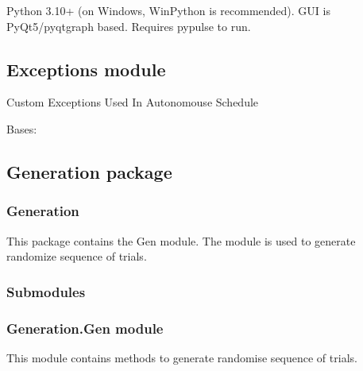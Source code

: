 \documentclass[letterpaper,10pt,english]{sphinxmanual}
\begin{document}
\sphinxAtStartPar
Python 3.10+ (on Windows, WinPython is recommended). GUI is PyQt5/pyqtgraph based. Requires pypulse to run.

\sphinxstepscope


\subsection{Exceptions module}
\label{\detokenize{NoSeMazeSchedule/Exceptions:module-Exceptions}}\label{\detokenize{NoSeMazeSchedule/Exceptions:exceptions-module}}\label{\detokenize{NoSeMazeSchedule/Exceptions::doc}}
\sphinxAtStartPar
Custom Exceptions Used In Autonomouse Schedule

\begin{fulllineitems}
\label{\detokenize{NoSeMazeSchedule/Exceptions:Exceptions.RewardMapError}}
\pysigstartsignatures
{}
\pysigstopsignatures
\sphinxAtStartPar
Bases: 

\end{fulllineitems}


\sphinxstepscope


\subsection{Generation package}
\label{\detokenize{NoSeMazeSchedule/Generation:generation-package}}\label{\detokenize{NoSeMazeSchedule/Generation::doc}}

\subsubsection{Generation}
\label{\detokenize{NoSeMazeSchedule/Generation:generation}}
\sphinxAtStartPar
This package contains the Gen module. The module is used to generate randomize sequence of trials.


\subsubsection{Submodules}
\label{\detokenize{NoSeMazeSchedule/Generation:submodules}}

\subsubsection{Generation.Gen module}
\label{\detokenize{NoSeMazeSchedule/Generation:module-Generation.Gen}}\label{\detokenize{NoSeMazeSchedule/Generation:generation-gen-module}}
\sphinxAtStartPar
This module contains methods to generate randomise sequence of trials.
\end{document}
